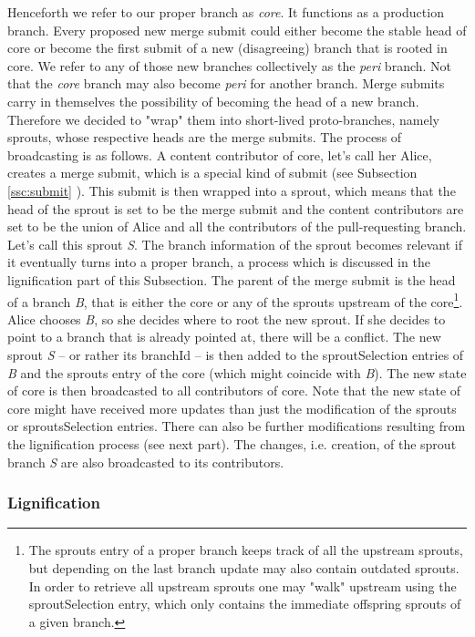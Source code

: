 Henceforth we refer to our proper branch as \textit{core}. It functions as a production branch. Every proposed new merge submit could either become the stable head of core or become the first submit of a new (disagreeing) branch that is rooted in core. We refer to any of those new branches collectively as the \textit{peri} branch. Not that the \textit{core} branch may also become \textit{peri} for another branch. Merge submits carry in themselves the possibility of becoming the head of a new branch. Therefore we decided to "wrap" them into short-lived proto-branches, namely sprouts, whose respective heads are the merge submits. The process of broadcasting is as follows. A content contributor of core, let's call her Alice, creates a merge submit, which is a special kind of submit (see Subsection \ref{ssc:submit} ). This submit is then wrapped into a sprout, which means that the head of the sprout is set to be the merge submit and the content contributors are set to be the union of Alice and all the contributors of the pull-requesting branch. Let's call this sprout \textit{S}. The branch information of the sprout becomes relevant if it eventually turns into a proper branch, a process which is discussed in the lignification part of this Subsection. The parent of the merge submit is the head of a branch \textit{B}, that is either the core or any of the sprouts upstream of the core\footnote{The sprouts entry of a proper branch keeps track of all the upstream sprouts, but depending on the last branch update may also contain outdated sprouts. In order to retrieve all upstream sprouts one may "walk" upstream using the sproutSelection entry, which only contains the immediate offspring sprouts of a given branch.}. Alice chooses \textit{B}, so she decides where to root the new sprout. If she decides to point to a branch that is already pointed at, there will be a conflict. The new sprout \textit{S} -- or rather its branchId -- is then added to the sproutSelection entries of \textit{B} and the sprouts entry of the core (which might coincide with \textit{B}). The new state of core is then broadcasted to all contributors of core. Note that the new state of core might have received more updates than just the modification of the sprouts or sproutsSelection entries. There can also be further modifications resulting from the lignification process (see next part). The changes, i.e. creation, of the sprout branch \textit{S} are also broadcasted to its contributors. 

\subsubsection*{Lignification}

